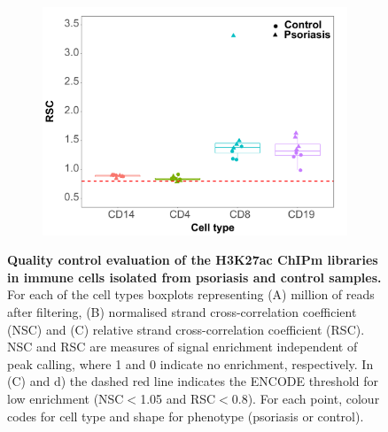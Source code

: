 \begin{figure}[htbp]
\begin{subfigure}{0.50\textwidth}
\includegraphics[width=\textwidth]{./Results2/pdfs/ChIPm_PS_CTL_RSC_boxplot}
\caption{}
\end{subfigure}
\caption[Quality control evaluation of the H3K27ac ChIPm libraries in immune cells isolated from psoriasis and control samples.]{\textbf{Quality control evaluation of the H3K27ac ChIPm libraries in immune cells isolated from psoriasis and control samples.} For each of the cell types boxplots representing (A) million of reads after filtering, (B) normalised strand cross-correlation coefficient (NSC) and (C) relative strand cross-correlation coefficient (RSC). NSC and RSC are measures of signal enrichment independent of peak calling, where 1 and 0 indicate no enrichment, respectively. In (C) and d) the dashed red line indicates the ENCODE threshold for low enrichment (NSC$<$1.05 and RSC$<$0.8). For each point, colour codes for cell type and shape for phenotype (psoriasis or control).}
\label{figure:ChIPm_PS_CTL_QC}
\end{figure} 





